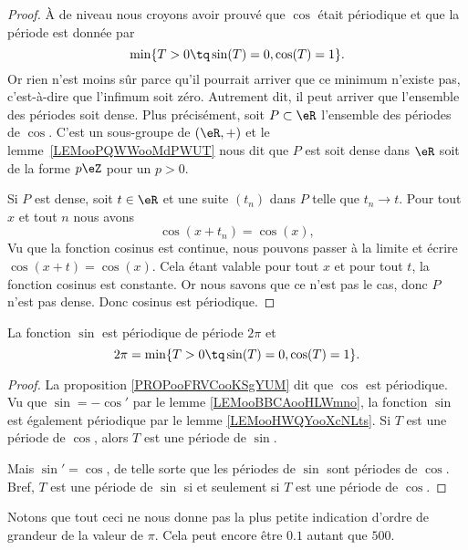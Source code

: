 \begin{proof}
    À de niveau nous croyons avoir prouvé que \( \cos\) était périodique et que la période est donnée par
    \begin{equation}
        \min\{ T>0\tq \sin(T)=0,\cos(T)=1 \}.
    \end{equation}
    Or rien n'est moins sûr parce qu'il pourrait arriver que ce minimum n'existe pas, c'est-à-dire que l'infimum soit zéro. Autrement dit, il peut arriver que l'ensemble des périodes soit dense. Plus précisément, soit \( P\subset \eR\) l'ensemble des périodes de \( \cos\). C'est un sous-groupe de \( (\eR,+)\) et le lemme~\ref{LEMooPQWWooMdPWUT} nous dit que \( P\) est soit dense dans \( \eR\) soit de la forme \( p\eZ\) pour un \( p>0\).

    Si \( P\) est dense, soit \( t\in \eR\) et une suite \( (t_n)\) dans \( P\) telle que \( t_n\to t\). Pour tout \( x\) et tout \( n\) nous avons
    \begin{equation}
        \cos(x+t_n)=\cos(x),
    \end{equation}
    Vu que la fonction cosinus est continue, nous pouvons passer à la limite et écrire \( \cos(x+t)=\cos(x)\). Cela étant valable pour tout \( x\) et pour tout \( t\), la fonction cosinus est constante. Or nous savons que ce n'est pas le cas, donc \( P\) n'est pas dense. Donc cosinus est périodique.
\end{proof}

\begin{proposition}     \label{PROPooKNLAooLwQHea}
    La fonction \( \sin\) est périodique de période \( 2\pi\) et
    \begin{equation}
        2\pi=\min\{ T>0\tq \sin(T)=0,\cos(T)=1 \}.
    \end{equation}
\end{proposition}

\begin{proof}
    La proposition \ref{PROPooFRVCooKSgYUM} dit que \( \cos\) est périodique. Vu que \( \sin=-\cos'\) par le lemme \ref{LEMooBBCAooHLWmno}, la fonction \( \sin\) est également périodique par le lemme \ref{LEMooHWQYooXcNLts}. Si \( T\) est une période de \( \cos\), alors \( T\) est une période de \( \sin\).

    Mais \( \sin'=\cos\), de telle sorte que les périodes de \( \sin\) sont périodes de \( \cos\). Bref, \( T\) est une période de \( \sin\) si et seulement si \( T\) est une période de \( \cos\).
\end{proof}

\begin{normaltext}
Notons que tout ceci ne nous donne pas la plus petite indication d'ordre de grandeur de la valeur de \( \pi\). Cela peut encore être \( 0.1\) autant que \( 500\).
\end{normaltext}


